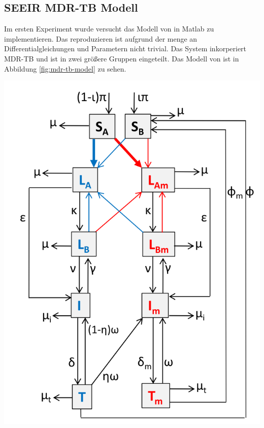 \documentclass[paper=a4, fontsize=11pt, ngerman, abstract=on]{scrartcl}
\numberwithin{equation}{section} %
\numberwithin{figure}{section} %
\numberwithin{table}{section} %
\begin{document}
\subsection{SEEIR MDR-TB Modell}

Im ersten Experiment wurde versucht das Modell von \cite{Trauer2014} in Matlab zu implementieren. Das reproduzieren  ist aufgrund der menge an Differentialgleichungen und Parametern nicht trivial. Das System inkorperiert MDR-TB und ist in zwei größere Gruppen eingeteilt. Das Modell von \cite{Trauer2014} ist in Abbildung \ref{fig:mdr-tb-model} zu sehen.

\begin{minipage}{0.4\linewidth}
  \includegraphics[width=\linewidth]{images/mdr_tb_model}
  \label{fig:mdr-tb-model}
\end{minipage}\hfill
\end{document}
